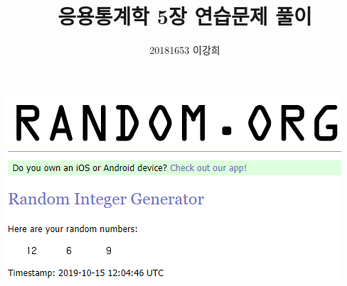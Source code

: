 \documentclass[12px]{article}
\title{응용통계학 5장 연습문제 풀이}
\author{20181653 이강희}
\date{}
\begin{document}
\maketitle

\includegraphics[scale=0.7]{random}
\end{document}
